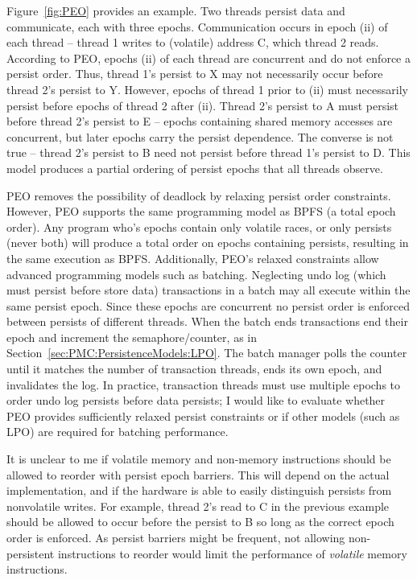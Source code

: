 Figure~\ref{fig:PEO} provides an example.
Two threads persist data and communicate, each with three epochs.
Communication occurs in epoch (ii) of each thread -- thread 1 writes to (volatile) address C, which thread 2 reads.
According to PEO, epochs (ii) of each thread are concurrent and do not enforce a persist order.
Thus, thread 1's persist to X may not necessarily occur before thread 2's persist to Y.
However, epochs of thread 1 prior to (ii) must necessarily persist before epochs of thread 2 after (ii).
Thread 2's persist to A must persist before thread 2's persist to E -- epochs containing shared memory accesses are concurrent, but later epochs carry the persist dependence.
The converse is not true -- thread 2's persist to B need not persist before thread 1's persist to D.
This model produces a partial ordering of persist epochs that all threads observe.

PEO removes the possibility of deadlock by relaxing persist order constraints.
However, PEO supports the same programming model as BPFS (a total epoch order).
Any program who's epochs contain only volatile races, or only persists (never both) will produce a total order on epochs containing persists, resulting in the same execution as BPFS.
Additionally, PEO's relaxed constraints allow advanced programming models such as batching.
Neglecting undo log (which must persist before store data) transactions in a batch may all execute within the same persist epoch.
Since these epochs are concurrent no persist order is enforced between persists of different threads.
When the batch ends transactions end their epoch and increment the semaphore/counter, as in Section~\ref{sec:PMC:PersistenceModels:LPO}.
The batch manager polls the counter until it matches the number of transaction threads, ends its own epoch, and invalidates the log.
In practice, transaction threads must use multiple epochs to order undo log persists before data persists; I would like to evaluate whether PEO provides sufficiently relaxed persist constraints or if other models (such as LPO) are required for batching performance.

It is unclear to me if volatile memory and non-memory instructions should be allowed to reorder with persist epoch barriers.
This will depend on the actual implementation, and if the hardware is able to easily distinguish persists from nonvolatile writes.
For example, thread 2's read to C in the previous example should be allowed to occur before the persist to B so long as the correct epoch order is enforced.
As persist barriers might be frequent, not allowing non-persistent instructions to reorder would limit the performance of \emph{volatile} memory instructions.

